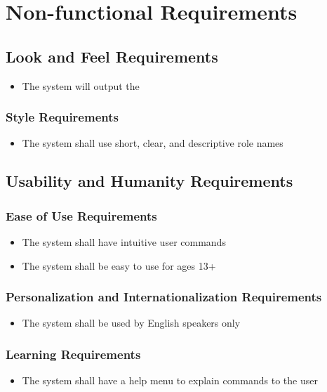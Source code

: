 \documentclass[12pt, titlepage]{article}
\begin{document}
\section{Non-functional Requirements}

\subsection{Look and Feel Requirements}
\begin{itemize}
    \item The system will output the 
\end{itemize}

\subsubsection{Style Requirements}
\begin{itemize}
    \item The system shall use short, clear, and descriptive role names
\end{itemize}

\subsection{Usability and Humanity Requirements}
\subsubsection{Ease of Use Requirements}
\begin{itemize}
    \item The system shall have intuitive user commands
    \item The system shall be easy to use for ages 13+
\end{itemize}
\subsubsection{Personalization and Internationalization Requirements}
\begin{itemize}
    \item The system shall be used by English speakers only
\end{itemize}
\subsubsection{Learning Requirements}
\begin{itemize}
    \item The system shall have a help menu to explain commands to the user
\end{itemize}
\end{document}

